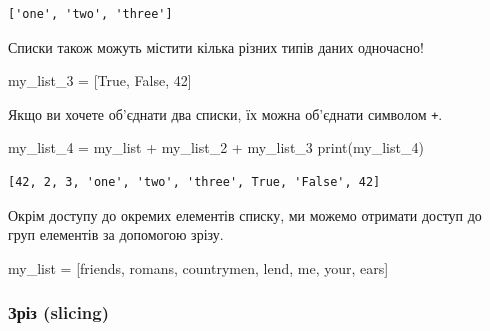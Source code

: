 \documentclass[
  letterpaper,
]{report}
\newenvironment{Shaded}{\begin{snugshade}}{\end{snugshade}}
\newcommand{\BuiltInTok}[1]{\textcolor[rgb]{0.00,0.23,0.31}{#1}}
\newcommand{\DecValTok}[1]{\textcolor[rgb]{0.68,0.00,0.00}{#1}}
\newcommand{\NormalTok}[1]{\textcolor[rgb]{0.00,0.23,0.31}{#1}}
\newcommand{\OperatorTok}[1]{\textcolor[rgb]{0.37,0.37,0.37}{#1}}
\newcommand{\StringTok}[1]{\textcolor[rgb]{0.13,0.47,0.30}{#1}}
\newcommand{\VariableTok}[1]{\textcolor[rgb]{0.07,0.07,0.07}{#1}}
\begin{document}
\begin{verbatim}
['one', 'two', 'three']
\end{verbatim}

Списки також можуть містити кілька різних типів даних одночасно!

\begin{Shaded}
\begin{Highlighting}[]
\NormalTok{my\_list\_3 }\OperatorTok{=}\NormalTok{ [}\VariableTok{True}\NormalTok{, }\StringTok{\textquotesingle{}False\textquotesingle{}}\NormalTok{, }\DecValTok{42}\NormalTok{]}
\end{Highlighting}
\end{Shaded}

Якщо ви хочете об'єднати два списки, їх можна об'єднати символом
\texttt{+}.

\begin{Shaded}
\begin{Highlighting}[]
\NormalTok{my\_list\_4 }\OperatorTok{=}\NormalTok{ my\_list }\OperatorTok{+}\NormalTok{ my\_list\_2 }\OperatorTok{+}\NormalTok{ my\_list\_3}
\BuiltInTok{print}\NormalTok{(my\_list\_4)}
\end{Highlighting}
\end{Shaded}

\begin{verbatim}
[42, 2, 3, 'one', 'two', 'three', True, 'False', 42]
\end{verbatim}

Окрім доступу до окремих елементів списку, ми можемо отримати доступ до
груп елементів за допомогою зрізу.

\begin{Shaded}
\begin{Highlighting}[]
\NormalTok{my\_list }\OperatorTok{=}\NormalTok{ [}\StringTok{\textquotesingle{}friends\textquotesingle{}}\NormalTok{, }\StringTok{\textquotesingle{}romans\textquotesingle{}}\NormalTok{, }\StringTok{\textquotesingle{}countrymen\textquotesingle{}}\NormalTok{, }\StringTok{\textquotesingle{}lend\textquotesingle{}}\NormalTok{, }\StringTok{\textquotesingle{}me\textquotesingle{}}\NormalTok{, }\StringTok{\textquotesingle{}your\textquotesingle{}}\NormalTok{, }\StringTok{\textquotesingle{}ears\textquotesingle{}}\NormalTok{]}
\end{Highlighting}
\end{Shaded}

\hypertarget{ux437ux440ux456ux437-slicing}{%
\subsubsection{Зріз (slicing)}\label{ux437ux440ux456ux437-slicing}}
\end{document}
